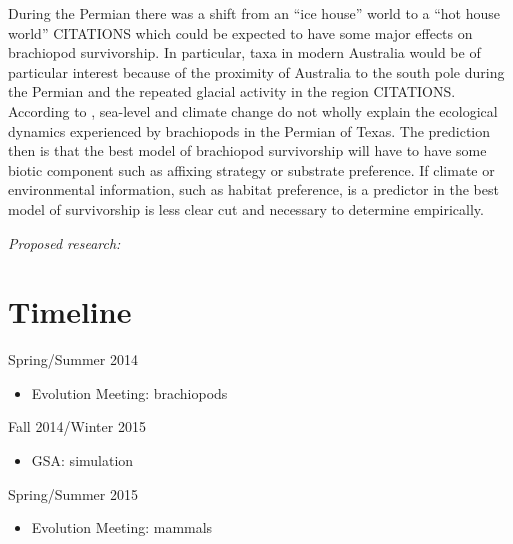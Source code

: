 \documentclass[12pt,letterpaper]{article}
\begin{document}
During the Permian there was a shift from an ``ice house'' world to a ``hot house world'' CITATIONS which could be expected to have some major effects on brachiopod survivorship. In particular, taxa in modern Australia would be of particular interest because of the proximity of Australia to the south pole during the Permian and the repeated glacial activity in the region CITATIONS. According to \citet{Olszewski2004}, sea-level and climate change do not wholly explain the ecological dynamics experienced by brachiopods in the Permian of Texas. The prediction then is that the best model of brachiopod survivorship will have to have some biotic component such as affixing strategy or substrate preference. If climate or environmental information, such as habitat preference, is a predictor in the best model of survivorship is less clear cut and necessary to determine empirically.


\textit{Proposed research:}






\clearpage
\section{Timeline}

Spring/Summer 2014
\begin{itemize}
  \item Evolution Meeting: brachiopods
\end{itemize}

Fall 2014/Winter 2015
\begin{itemize}
  \item GSA: simulation
\end{itemize}

Spring/Summer 2015
\begin{itemize}
  \item Evolution Meeting: mammals
\end{itemize}
\end{document}
